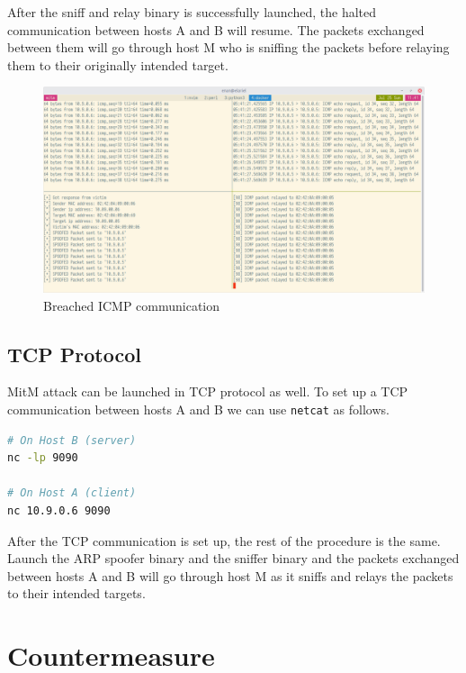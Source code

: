 \documentclass[12pt]{article}
\begin{document}
After the sniff and relay binary is successfully launched, the halted
communication between hosts A and B will resume. The packets exchanged between
them will go through host M who is sniffing the packets before relaying them to
their originally intended target.

\vspace{1cm}
\begin{figure}[h]
    \centering
    \includegraphics[scale=0.3]{breached-icmp}
    \caption{Breached ICMP communication}
\end{figure}

\FloatBarrier

\vspace{1cm}
\subsection{TCP Protocol}

MitM attack can be launched in TCP protocol as well. To set up a TCP
communication between hosts A and B we can use \verb|netcat| as follows.

\vspace{1cm}
\begin{lstlisting}[language=bash,caption={Start TCP communication},captionpos=b]
# On Host B (server)
nc -lp 9090

# On Host A (client)
nc 10.9.0.6 9090
\end{lstlisting}
\vspace{1cm}

After the TCP communication is set up, the rest of the procedure is the same.
Launch the ARP spoofer binary and the sniffer binary and the packets exchanged
between hosts A and B will go through host M as it sniffs and relays the packets
to their intended targets.

\section{Countermeasure}
\end{document}
